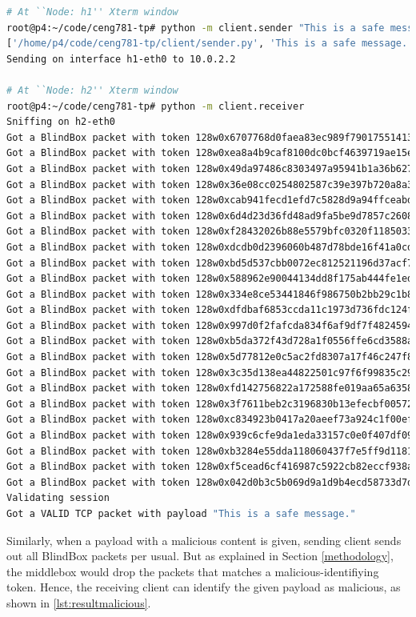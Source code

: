 \documentclass{winslabreport}
\begin{document}
\begin{lstlisting}[caption={A Safe Message},label={lst:resultsafe},language=bash]
# At ``Node: h1'' Xterm window
root@p4:~/code/ceng781-tp# python -m client.sender "This is a safe message."
['/home/p4/code/ceng781-tp/client/sender.py', 'This is a safe message.']
Sending on interface h1-eth0 to 10.0.2.2

# At ``Node: h2'' Xterm window
root@p4:~/code/ceng781-tp# python -m client.receiver
Sniffing on h2-eth0
Got a BlindBox packet with token 128w0x6707768d0faea83ec989f79017551413
Got a BlindBox packet with token 128w0xea8a4b9caf8100dc0bcf4639719ae15e
Got a BlindBox packet with token 128w0x49da97486c8303497a95941b1a36b627
Got a BlindBox packet with token 128w0x36e08cc0254802587c39e397b720a8a3
Got a BlindBox packet with token 128w0xcab941fecd1efd7c5828d9a94ffceabd
Got a BlindBox packet with token 128w0x6d4d23d36fd48ad9fa5be9d7857c2608
Got a BlindBox packet with token 128w0xf28432026b88e5579bfc0320f1185033
Got a BlindBox packet with token 128w0xdcdb0d2396060b487d78bde16f41a0cd
Got a BlindBox packet with token 128w0xbd5d537cbb0072ec812521196d37acf7
Got a BlindBox packet with token 128w0x588962e90044134dd8f175ab444fe1ed
Got a BlindBox packet with token 128w0x334e8ce53441846f986750b2bb29c1b8
Got a BlindBox packet with token 128w0xdfdbaf6853ccda11c1973d736fdc124f
Got a BlindBox packet with token 128w0x997d0f2fafcda834f6af9df7f4824594
Got a BlindBox packet with token 128w0xb5da372f43d728a1f0556ffe6cd3588a
Got a BlindBox packet with token 128w0x5d77812e0c5ac2fd8307a17f46c247f8
Got a BlindBox packet with token 128w0x3c35d138ea44822501c97f6f99835c29
Got a BlindBox packet with token 128w0xfd142756822a172588fe019aa65a6358
Got a BlindBox packet with token 128w0x3f7611beb2c3196830b13efecbf00572
Got a BlindBox packet with token 128w0xc834923b0417a20aeef73a924c1f00ef
Got a BlindBox packet with token 128w0x939c6cfe9da1eda33157c0e0f407df09
Got a BlindBox packet with token 128w0xb3284e55dda118060437f7e5ff9d1181
Got a BlindBox packet with token 128w0xf5cead6cf416987c5922cb82eccf938a
Got a BlindBox packet with token 128w0x042d0b3c5b069d9a1d9b4ecd58733d7d
Validating session
Got a VALID TCP packet with payload "This is a safe message."
\end{lstlisting}

Similarly, when a payload with a malicious content is given, sending client sends out all BlindBox packets per usual. But as explained in Section \ref{methodology}, the middlebox would drop the packets that matches a malicious-identifiying token. Hence, the receiving client can identify the given payload as malicious, as shown in \autoref{lst:resultmalicious}.
\end{document}
